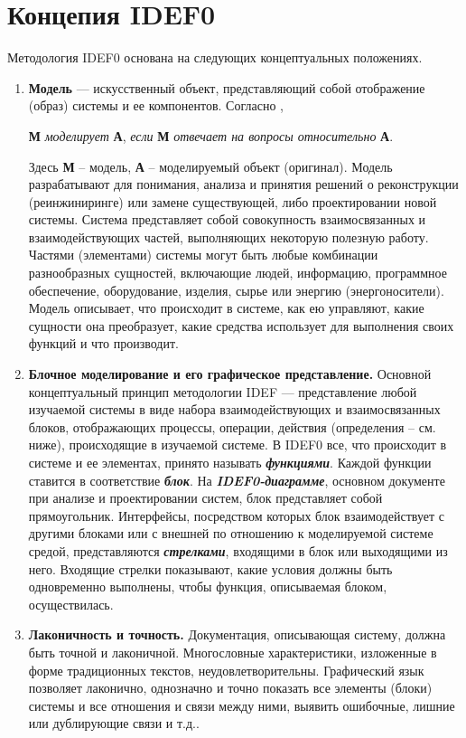 \documentclass[a4paper, final]{article}
\begin{document}
\newpage
\section{Концепия IDEF0}
Методология IDEF0 основана на следующих концептуальных положениях.
\begin{enumerate}
	\item \textbf{Модель} --- искусственный объект, представляющий собой отображение (образ) системы и ее компонентов. Согласно \cite{bib:marka},

  \textbf{М} \textit{моделирует} \textbf{А}, \textit{если} \textbf{М} \textit{отвечает на вопросы относительно} \textbf{А}.

  Здесь \textbf{М} -- модель, \textbf{А} -- моделируемый объект (оригинал). Модель разрабатывают для понимания, анализа и принятия решений о реконструкции (реинжиниринге) или замене существующей, либо проектировании новой системы. Система представляет собой совокупность взаимосвязанных и взаимодействующих частей, выполняющих некоторую полезную работу. Частями  (элементами) системы могут быть любые комбинации разнообразных сущностей, включающие людей, информацию, программное обеспечение, оборудование, изделия, сырье или энергию (энергоносители). Модель описывает, что происходит в системе, как ею управляют, какие сущности она преобразует, какие средства использует для выполнения своих функций и что производит.

  \item \textbf{Блочное моделирование и его графическое представление.} Основной концептуальный принцип методологии IDEF --- представление любой изучаемой системы в виде набора взаимодействующих и взаимосвязанных блоков, отображающих процессы, операции, действия (определения -- см. ниже), происходящие в изучаемой системе. В IDEF0 все, что происходит в системе и ее элементах, принято называть \textbf{\textit{функциями}}. Каждой функции ставится в соответствие \textbf{\textit{блок}}. На \textbf{\textit{IDEF0-диаграмме}}, основном документе при анализе и проектировании систем, блок представляет собой прямоугольник. Интерфейсы, посредством которых блок взаимодействует с другими блоками или с внешней по отношению к моделируемой системе средой, представляются \textbf{\textit{стрелками}}, входящими в блок или выходящими из него. Входящие стрелки показывают, какие условия должны быть одновременно выполнены, чтобы функция, описываемая блоком, осуществилась.
  
  \item \textbf{Лаконичность и точность.} Документация, описывающая систему, должна быть точной и лаконичной. Многословные характеристики, изложенные в форме традиционных текстов, неудовлетворительны. Графический язык позволяет лаконично, однозначно и точно показать все элементы (блоки) системы и все отношения и связи между ними, выявить ошибочные, лишние или дублирующие связи и т.д..
  

\end{enumerate}
\end{document}
